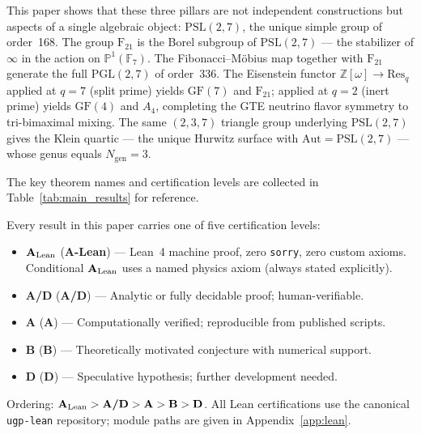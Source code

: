 \documentclass[11pt]{article}
\theoremstyle{remark}
\newcommand{\GF}[1]{\ensuremath{\mathrm{GF}(#1)}}
\newcommand{\Ngen}{\ensuremath{N_{\mathrm{gen}}}}
\newcommand{\PSLtwo}{\ensuremath{\mathrm{PSL}(2,7)}}
\newcommand{\PGLtwo}{\ensuremath{\mathrm{PGL}(2,7)}}
\newcommand{\FineSeven}{\ensuremath{\mathrm{F}_{21}}}
\newcommand{\AltFour}{\ensuremath{A_4}}
\newcommand{\ProjLine}{\ensuremath{\mathbb{P}^1(\mathbb{F}_7)}}
\newcommand{\CatA}{\textbf{A}}
\newcommand{\CatAL}{\ensuremath{\textbf{A}_{\rm Lean}}}
\newcommand{\CatAD}{\textbf{A/D}}
\newcommand{\CatB}{\textbf{B}}
\newcommand{\CatD}{\textbf{D}}
\begin{document}
This paper shows that these three pillars are not independent constructions but
aspects of a single algebraic object: $\PSLtwo$, the unique simple group of
order~168.
The group $\FineSeven$ is the Borel subgroup of $\PSLtwo$ — the stabilizer of
$\infty$ in the action on $\ProjLine$.
The Fibonacci--Möbius map together with $\FineSeven$ generate the full
$\PGLtwo$ of order~336.
The Eisenstein functor $\mathbb{Z}[\omega] \to \mathrm{Res}_q$ applied at
$q = 7$ (split prime) yields $\GF{7}$ and $\FineSeven$; applied at $q = 2$
(inert prime) yields $\GF{4}$ and $\AltFour$, completing the GTE neutrino flavor
symmetry to tri-bimaximal mixing.
The same $(2,3,7)$ triangle group underlying $\PSLtwo$ gives the Klein quartic —
the unique Hurwitz surface with $\mathrm{Aut} = \PSLtwo$ — whose genus equals
$\Ngen = 3$.

The key theorem names and certification levels are collected in
Table~\ref{tab:main_results} for reference.

\begin{tcolorbox}[colback=gray!8,colframe=gray!50,title=Claim-Strength Taxonomy,
  fonttitle=\bfseries,breakable]
\small
Every result in this paper carries one of five certification levels:
\begin{itemize}[leftmargin=1.8em,itemsep=2pt,topsep=2pt]
  \item \CatAL{} (\textbf{A-Lean}) --- Lean~4 machine proof, zero \texttt{sorry},
    zero custom axioms.
    Conditional \CatAL{} uses a named physics axiom (always stated explicitly).
  \item \CatAD{} (\textbf{A/D}) --- Analytic or fully decidable proof; human-verifiable.
  \item \CatA{} (\textbf{A}) --- Computationally verified; reproducible from published scripts.
  \item \CatB{} (\textbf{B}) --- Theoretically motivated conjecture with numerical support.
  \item \CatD{} (\textbf{D}) --- Speculative hypothesis; further development needed.
\end{itemize}
Ordering: $\CatAL > \CatAD > \CatA > \CatB > \CatD$.
All Lean certifications use the canonical \texttt{ugp-lean} repository;
module paths are given in Appendix~\ref{app:lean}.
\end{tcolorbox}
\end{document}
